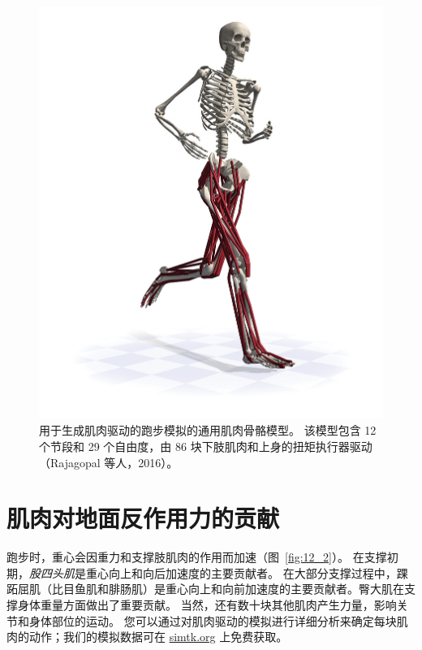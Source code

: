 \begin{figure}[!htb]
	\centering
	\includegraphics[width=1.0\linewidth]{chap12/12_1}
	\caption{用于生成肌肉驱动的跑步模拟的通用肌肉骨骼模型。
		该模型包含 12 个节段和 29 个自由度，由 86 块下肢肌肉和上身的扭矩执行器驱动（Rajagopal 等人，2016）。 \label{fig:12_1}}
\end{figure}


\section{肌肉对地面反作用力的贡献}

跑步时，重心会因重力和支撑肢肌肉的作用而加速（图~\ref{fig:12_2}）。
在支撑初期，\textit{股四头肌}是重心向上和向后加速度的主要贡献者。
在大部分支撑过程中，踝跖屈肌（比目鱼肌和腓肠肌）是重心向上和向前加速度的主要贡献者。臀大肌在支撑身体重量方面做出了重要贡献。
当然，还有数十块其他肌肉产生力量，影响关节和身体部位的运动。
您可以通过对肌肉驱动的模拟进行详细分析来确定每块肌肉的动作；我们的模拟数据可在 \href{simtk.org}{simtk.org} 上免费获取。


